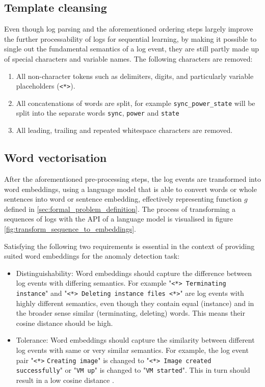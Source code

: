 \subsection{Template cleansing \label{sec:template_cleansing}}
Even though log parsing and the aforementioned ordering steps largely improve the further processability of logs for sequential learning, by making it possible to single out the fundamental semantics of a log event, they are still partly made up of special characters and variable names. The following characters are removed:
\begin{enumerate}
	\item All non-character tokens such as delimiters, digits, and particularly variable placeholders (\verb!<*>!).
	\item All concatenations of words are split, for example \verb!sync_power_state! will be split into the separate words \verb!sync!, \verb!power! and \verb!state!
	\item All leading, trailing and repeated whitespace characters are removed.
\end{enumerate}

\subsection{Word vectorisation \label{sec:word_vectorization}}
After the aforementioned pre-processing steps, the log events are transformed into word embeddings, using a language model that is able to convert words or whole sentences into word or sentence embedding, effectively representing function $g$ defined in \ref{sec:formal_problem_definition}. The process of transforming a sequences of logs with the API of a language model is visualised in figure \ref{fig:transform_sequence_to_embeddings}.

Satisfying the following two requirements is essential in the context of providing suited word embeddings for the anomaly detection task:
\begin{itemize}
	\item Distinguishability: Word embeddings should capture the difference between log events with differing semantics. For example "\verb!<*> Terminating instance!" and "\verb!<*> Deleting instance files <*>!" are log events with highly different semantics, even though they contain equal (instance) and in the broader sense similar (terminating, deleting) words. This means their cosine distance should be high.
	\item Tolerance: Word embeddings should capture the similarity between different log events with same or very similar semantics. For example, the log event pair "\verb!<*>! \verb!Creating image!" is changed to "\verb!<*> Image created successfully!" or "\verb!VM up!" is changed to "\verb!VM started!". This in turn should result in a low cosine distance \cite{zhang2019robust}.
\end{itemize}

